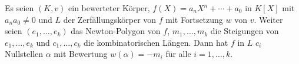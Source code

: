 \begin{Prop}
Es seien $(K,v)$ ein bewerteter Körper, $f(X)=a_nX^n+ \cdots + a_0$ in $K[X]$ mit $a_n a_0 \neq 0$
und $L$ der Zerfällungskörper von $f$ mit Fortsetzung $w$ von $v$. Weiter seien $(e_1, \dots, e_k)$ das Newton-Polygon von $f$, $m_1,\dots,m_k$ die Steigungen von $e_1, \dots, e_k$ und $c_1,\dots, c_k$ die kombinatorischen Längen. Dann hat $f$ in $L$ $c_i$ Nullstellen $\alpha$ mit Bewertung 
	$w(\alpha) = -m_i$ für alle $i=1, \dots, k$.
\end{Prop}





